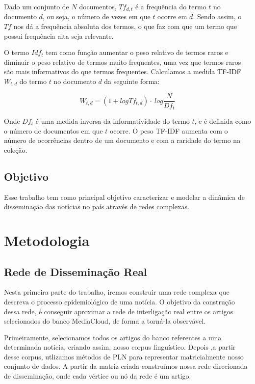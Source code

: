 \documentclass[a4paper,12pt]{article}
\begin{document}
\begin{description}
  Dado um conjunto de $N$ documentos, $Tf_{d,t}$ é a frequência do termo $t$ no documento
  $d$, ou seja, o número de vezes em que $t$ ocorre em $d$. Sendo assim, o $Tf$ nos dá a frequência absoluta dos termos, 
  o que faz com que um termo que possui frequência alta seja relevante.
  
  O termo $Idf_{t}$ tem como função aumentar o peso relativo de termos raros e diminuir o peso relativo de termos muito frequentes,
  uma vez que termos raros são mais informativos do que termos frequentes. Calculamos a medida TF-IDF $ W_{t,d}$ do termo $t$ no documento
  $d$ da seguinte forma:

  $$ W_{t,d} = (1 + log Tf_{t,d}) \cdot \ log \dfrac{N}{Df_{t}}$$

  Onde $Df_{t}$ é uma medida inversa da informatividade do termo $t$, e é definida como o número de documentos em que $t$ ocorre. O peso
  TF-IDF aumenta com o número de ocorrências dentro de um documento e com a raridade do termo na coleção.
\end{description}

\subsection{Objetivo}

Esse trabalho tem como principal objetivo caracterizar e modelar a dinâmica de disseminação das notícias no país através de redes complexas.




\pagebreak
\section{Metodologia}

\subsection{Rede de Disseminação Real}

Nesta primeira parte do trabalho, iremos construir uma rede complexa que descreva o processo epidemiológico de uma notícia. O objetivo
da construção dessa rede, é conseguir aproximar a rede de interligação real entre os artigos selecionados do banco
MediaCloud, de forma a torná-la observável.

Primeiramente, selecionamos todos os artigos do banco referentes a uma determinada notícia, criando assim, nosso corpus linguístico.
Depois ,a partir desse corpus, utlizamos métodos de PLN para representar matricialmente nosso conjunto de dados. A partir da matriz 
criada construímos nossa rede direcionada de disseminação, onde cada vértice ou nó da rede é um artigo.
\end{document}
